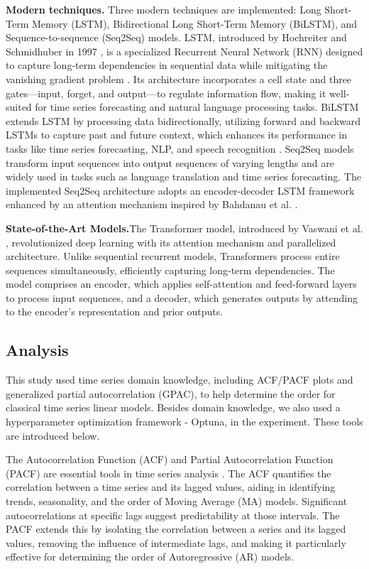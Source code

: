 \documentclass[sn-mathphys-num]{sn-jnl}
\theoremstyle{thmstyleone}%
\theoremstyle{thmstyletwo}%
\theoremstyle{thmstylethree}%
\begin{document}
\textbf{Modern techniques.}
Three modern techniques are implemented: Long Short-Term Memory (LSTM), Bidirectional Long Short-Term Memory (BiLSTM), and Sequence-to-sequence (Seq2Seq) models. 
LSTM, introduced by Hochreiter and Schmidhuber in 1997 \cite{hochreiter1997lstm}, is a specialized Recurrent Neural Network (RNN) designed to capture long-term dependencies in sequential data while mitigating the vanishing gradient problem \cite{medsker2001recurrent}. Its architecture incorporates a cell state and three gates—input, forget, and output—to regulate information flow, making it well-suited for time series forecasting and natural language processing tasks. BiLSTM extends LSTM by processing data bidirectionally, utilizing forward and backward LSTMs to capture past and future context, which enhances its performance in tasks like time series forecasting, NLP, and speech recognition \cite{graves2005framewise}. Seq2Seq models transform input sequences into output sequences of varying lengths and are widely used in tasks such as language translation and time series forecasting. The implemented Seq2Seq architecture adopts an encoder-decoder LSTM framework enhanced by an attention mechanism inspired by Bahdanau et al. \cite{bahdanau2014neural}.

\textbf{State-of-the-Art Models.}The Transformer model, introduced by Vaswani et al. \cite{vaswani2017attention}, revolutionized deep learning with its attention mechanism and parallelized architecture. Unlike sequential recurrent models, Transformers process entire sequences simultaneously, efficiently capturing long-term dependencies. The model comprises an encoder, which applies self-attention and feed-forward layers to process input sequences, and a decoder, which generates outputs by attending to the encoder’s representation and prior outputs.

\subsection{Analysis}
This study used time series domain knowledge, including ACF/PACF plots and generalized partial autocorrelation (GPAC), to help determine the order for classical time series linear models. Besides domain knowledge, we also used a hyperparameter optimization framework - Optuna, in the experiment. These tools are introduced below. 

The Autocorrelation Function (ACF) and Partial Autocorrelation Function (PACF) are essential tools in time series analysis \cite{box2015time, hyndman2018forecasting, chatfield2019analysis}. The ACF quantifies the correlation between a time series and its lagged values, aiding in identifying trends, seasonality, and the order of Moving Average (MA) models. Significant autocorrelations at specific lags suggest predictability at those intervals. The PACF extends this by isolating the correlation between a series and its lagged values, removing the influence of intermediate lags, and making it particularly effective for determining the order of Autoregressive (AR) models.
\end{document}
